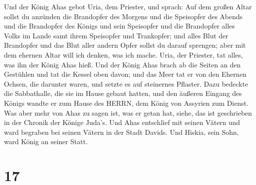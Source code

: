  Und der König Ahas gebot Uria, dem Priester, und sprach:
Auf dem großen Altar sollst du anzünden die Brandopfer des Morgens und
die Speisopfer des Abends und die Brandopfer des Königs und sein
Speisopfer und die Brandopfer alles Volks im Lande samt ihrem Speisopfer
und Trankopfer; und alles Blut der Brandopfer und das Blut aller andern
Opfer sollst du darauf sprengen; aber mit dem ehernen Altar will ich
denken, was ich mache.  Uria, der Priester, tat alles, was
ihn der König Ahas hieß.  Und der König Ahas brach ab die
Seiten an den Gestühlen und tat die Kessel oben davon; und das Meer tat
er von den Ehernen Ochsen, die darunter waren, und setzte es auf
steinernes Pflaster.  Dazu bedeckte die Sabbathalle, die
sie im Hause gebaut hatten, und den äußeren Eingang des Königs wandte er
zum Hause des HERRN, dem König von Assyrien zum Dienst. 
Was aber mehr von Ahas zu sagen ist, was er getan hat, siehe, das ist
geschrieben in der Chronik der Könige Juda's.  Und Ahas
entschlief mit seinen Vätern und ward begraben bei seinen Vätern in der
Stadt Davids. Und Hiskia, sein Sohn, ward König an seiner Statt.

\hypertarget{section-16}{%
\section{17}\label{section-16}}

